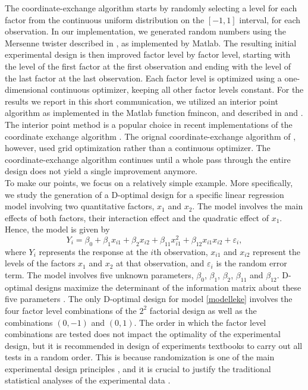 The coordinate-exchange algorithm starts by randomly selecting a level for each factor from the continuous uniform distribution on the $[-1,1]$ interval, for each observation. {\color{red}In our implementation, we generated random numbers using the Mersenne twister described in \cite{matsumoto}, as implemented by Matlab.} The resulting initial experimental design is then improved factor level by factor level, starting with the level of the first factor at the first observation and ending with the level of the last factor at the last observation. Each factor level is optimized using a one-dimensional continuous optimizer, keeping all other factor levels constant. For the results we report in this short communication, we utilized an interior point algorithm as implemented in the Matlab function fmincon, and described in \citet{byrd,byrd2} and \citet{waltz}. {\color{red} The interior point method is a popular choice in recent implementations of the coordinate exchange algorithm \citep{ruseckaite,huang}. The orignal coordinate-exchange algorithm of \cite{meyer}, however, used grid optimization rather than a continuous optimizer.} The coordinate-exchange algorithm continues until a whole pass through the entire design does not yield a single improvement {\color{red}anymore}.\\

To make our points, we focus on a relatively simple example. More specifically, we study the generation of a D-optimal design for a specific linear regression model involving two quantitative factors, $x_1$ and $x_2$. The model involves the main effects of both factors, their interaction effect and the quadratic effect of $x_1$. Hence, the model is given by
\begin{equation}\label{modelleke}
Y_i = \beta_0 + \beta_1x_{i1} + \beta_2x_{i2} + \beta_{11}x_{i1}^2 + \beta_{12}x_{i1}x_{i2} + \varepsilon_i,
\end{equation}
where $Y_i$ represents the response at the $i$th observation, $x_{i1}$ and $x_{i2}$ represent the levels of the factors $x_1$ and $x_2$ at that observation, and $\varepsilon_i$ is the random error term. The model involves five unknown parameters, $\beta_0$, $\beta_1$, $\beta_2$, $\beta_{11}$ and $\beta_{12}$. D-optimal designs maximize the determinant of the information matrix about these five parameters \citep{goos}. The only D-optimal design for model \eqref{modelleke} involves the four factor level combinations of the $2^2$ factorial design as well as the combinations $(0,-1)$ and $(0,1)$. The order in which the factor level combinations are tested does not impact the optimality of the experimental design, but it is recommended in design of experiments textbooks to carry out all tests in a random order. This is because randomization is one of the main experimental design principles \citep{mont}, and it is crucial to justify the traditional statistical analyses of the experimental data \citep{coxdr}.\\

